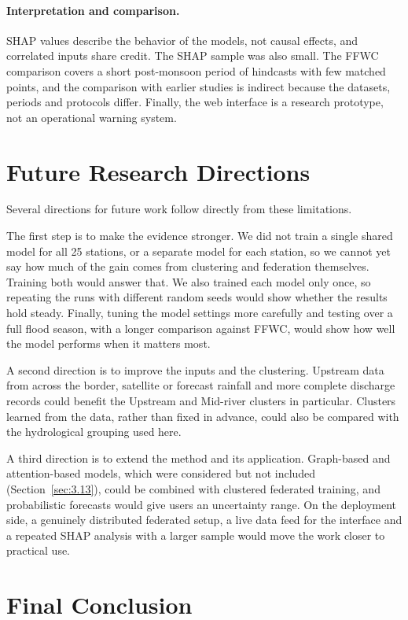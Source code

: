\paragraph{Interpretation and comparison.}
SHAP values describe the behavior of the models, not causal effects, and
correlated inputs share credit. The SHAP sample was also small. The FFWC
comparison covers a short post-monsoon period of hindcasts with few matched
points, and the comparison with earlier studies is indirect because the
datasets, periods and protocols differ. Finally, the web interface is a
research prototype, not an operational warning system.

\section{Future Research Directions}
\label{sec:5.7}

Several directions for future work follow directly from these limitations.

The first step is to make the evidence stronger. We did not train a single shared
model for all 25 stations, or a separate model for each station, so we cannot yet
say how much of the gain comes from clustering and federation themselves.
Training both would answer that. We also trained each model only once, so
repeating the runs with different random seeds would show whether the results
hold steady. Finally, tuning the model settings more carefully and testing over
a full flood season, with a longer comparison against FFWC, would show how well
the model performs when it matters most.

A second direction is to improve the inputs and the clustering. Upstream data
from across the border, satellite or forecast rainfall and more complete
discharge records could benefit the Upstream and Mid-river clusters in
particular. Clusters learned from the data, rather than fixed in advance, could
also be compared with the hydrological grouping used here.

A third direction is to extend the method and its application. Graph-based and
attention-based models, which were considered but not included
(Section~\ref{sec:3.13}), could be combined with clustered federated training,
and probabilistic forecasts would give users an uncertainty range. On the
deployment side, a genuinely distributed federated setup, a live data feed for
the interface and a repeated SHAP analysis with a larger sample would move the
work closer to practical use.

\section{Final Conclusion}
\label{sec:5.8}

